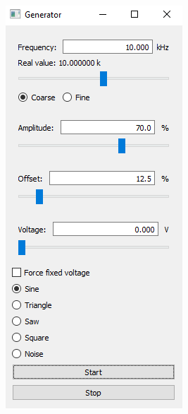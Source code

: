 \begin{figure}[H]
\begin{minipage}{0.3\linewidth}
	\includegraphics[width=1\linewidth]{Figs/Screenshots/ZeroElabGeneratorTab}
	\label{fig:zeroelabgeneratortab}	
	

\end{minipage}
\end{figure}
